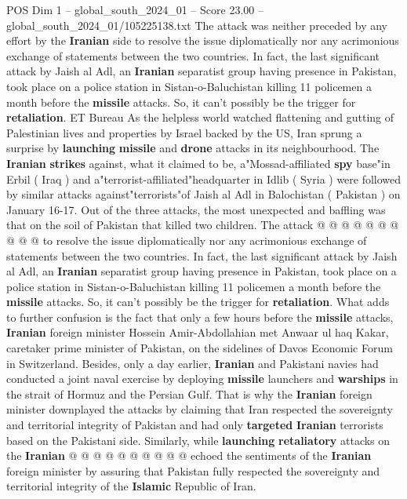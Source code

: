 \begin{textsample}{POS Dim 1 – global\_south\_2024\_01 – Score 23.00 – global\_south\_2024\_01/105225138.txt}  \label{ex:f1_pos_105}
The attack was neither preceded by any effort by the \textbf{Iranian} side to resolve the issue diplomatically nor any acrimonious exchange of statements between the two countries.
In fact, the last significant attack by Jaish al Adl, an \textbf{Iranian} separatist group having presence in Pakistan, took place on a police station in Sistan-o-Baluchistan killing 11 policemen a month before the \textbf{missile} attacks.
So, it can't possibly be the trigger for \textbf{retaliation}.
ET Bureau As the helpless world watched flattening and gutting of Palestinian lives and properties by Israel backed by the US, Iran sprung a surprise by \textbf{launching} \textbf{missile} and \textbf{drone} attacks in its neighbourhood.
The \textbf{Iranian} \textbf{strikes} against, what it claimed to be, a"Mossad-affiliated \textbf{spy} base"in Erbil ( Iraq ) and a"terrorist-affiliated"headquarter in Idlib ( Syria ) were followed by similar attacks against"terrorists"of Jaish al Adl in Balochistan ( Pakistan ) on January 16-17.
Out of the three attacks, the most unexpected and baffling was that on the soil of Pakistan that killed two children.
The attack @ @ @ @ @ @ @ @ @ @ to resolve the issue diplomatically nor any acrimonious exchange of statements between the two countries.
In fact, the last significant attack by Jaish al Adl, an \textbf{Iranian} separatist group having presence in Pakistan, took place on a police station in Sistan-o-Baluchistan killing 11 policemen a month before the \textbf{missile} attacks.
So, it can't possibly be the trigger for \textbf{retaliation}.
What adds to further confusion is the fact that only a few hours before the \textbf{missile} attacks, \textbf{Iranian} foreign minister Hossein Amir-Abdollahian met Anwaar ul haq Kakar, caretaker prime minister of Pakistan, on the sidelines of Davos Economic Forum in Switzerland.
Besides, only a day earlier, \textbf{Iranian} and Pakistani navies had conducted a joint naval exercise by deploying \textbf{missile} launchers and \textbf{warships} in the strait of Hormuz and the Persian Gulf.
That is why the \textbf{Iranian} foreign minister downplayed the attacks by claiming that Iran respected the sovereignty and territorial integrity of Pakistan and had only \textbf{targeted} \textbf{Iranian} terrorists based on the Pakistani side.
Similarly, while \textbf{launching} \textbf{retaliatory} attacks on the \textbf{Iranian} @ @ @ @ @ @ @ @ @ @ echoed the sentiments of the \textbf{Iranian} foreign minister by assuring that Pakistan fully respected the sovereignty and territorial integrity of the \textbf{Islamic} Republic of Iran.

\end{textsample}
